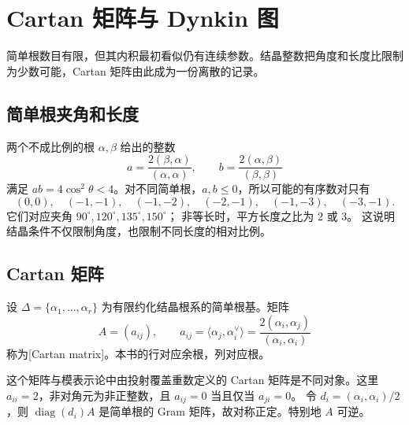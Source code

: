 
\section{Cartan 矩阵与 Dynkin 图}
\label{b5:sec:1702}

简单根数目有限，但其内积最初看似仍有连续参数。结晶整数把角度和长度比限制为少数可能，Cartan 矩阵由此成为一份离散的记录。


%
%

\subsection{简单根夹角和长度}
\label{b5:subsec:1702:01}

两个不成比例的根 \(\alpha,\beta\) 给出的整数
\[
	a=\frac{2(\beta,\alpha)}{(\alpha,\alpha)},\qquad b=\frac{2(\alpha,\beta)}{(\beta,\beta)}
\]
满足 \(ab=4\cos^2\theta<4\)。对不同简单根，\(a,b\leq0\)，所以可能的有序数对只有
\[
	(0,0),\quad(-1,-1),\quad(-1,-2),\quad(-2,-1), \quad(-1,-3),\quad(-3,-1).
\]
它们对应夹角 \(90^\circ,120^\circ,135^\circ,150^\circ\)； 非等长时，平方长度之比为 \(2\) 或 \(3\)。 这说明结晶条件不仅限制角度，也限制不同长度的相对比例。

\subsection{Cartan 矩阵}
\label{b5:subsec:1702:02}

\begin{definition}\label{b5:def:root-cartan-matrix}
	设 \(\Delta=\{\alpha_1,\ldots,\alpha_r\}\) 为有限约化结晶根系的简单根基。矩阵
	\[
		A=(a_{ij}),\qquad a_{ij}=\langle\alpha_j,\alpha_i^\vee\rangle =\frac{2(\alpha_i,\alpha_j)}{(\alpha_i,\alpha_i)}
	\]
	称为[Cartan matrix]。本书的行对应余根，列对应根。
\end{definition}

这个矩阵与模表示论中由投射覆盖重数定义的 Cartan 矩阵是不同对象。这里 \(a_{ii}=2\)，非对角元为非正整数，且 \(a_{ij}=0\) 当且仅当 \(a_{ji}=0\)。 令 \(d_i=(\alpha_i,\alpha_i)/2\)，则 \(\operatorname{diag}(d_i)A\) 是简单根的 Gram 矩阵，故对称正定。特别地 \(A\) 可逆。

